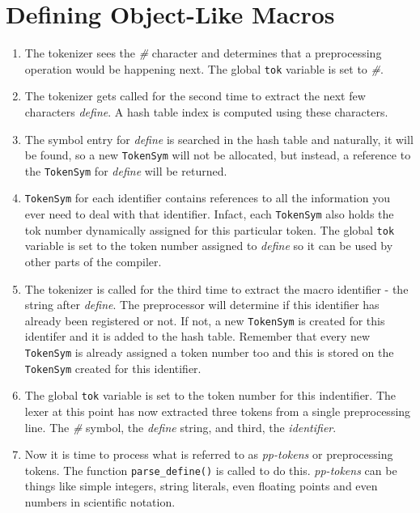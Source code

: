 \section{Defining Object-Like Macros}


\begin{enumerate}
\item The tokenizer sees the \emph{\#} character and determines that a preprocessing operation would be happening next. The global \verb|tok| variable is set to \emph{\#}.

\item The tokenizer gets called for the second time to extract the next few characters \emph{define}. A hash table index is computed using these characters.

\item The symbol entry for \emph{define} is searched in the hash table and naturally, it will be found, so a new \verb|TokenSym| will not be allocated, but instead, a reference to the \verb|TokenSym| for \emph{define} will be returned.

\item \verb|TokenSym| for each identifier contains references to all the information you ever need to deal with that identifier. Infact, each \verb|TokenSym| also holds the tok number dynamically assigned for this particular token. The global \verb|tok| variable is set to the token number assigned to \emph{define} so it can be used by other parts of the compiler.

\item The tokenizer is called for the third time to extract the macro identifier - the string after \emph{define}. The preprocessor will determine if this identifier has already been registered or not. If not, a new \verb|TokenSym| is created for this identifer and it is added to the hash table. Remember that every new \verb|TokenSym| is already assigned a token number too and this is stored on the \verb|TokenSym| created for this identifier.

\item The global \verb|tok| variable is set to the token number for this indentifier. The lexer at this point has now extracted three tokens from a single preprocessing line. The \emph{\#} symbol, the \emph{define} string, and third, the \emph{identifier}.

\item Now it is time to process what is referred to as \emph{pp-tokens} or preprocessing tokens. The function \verb|parse_define()| is called to do this. \emph{pp-tokens} can be things like simple integers, string literals, even floating points and even numbers in scientific notation.


\end{enumerate}
